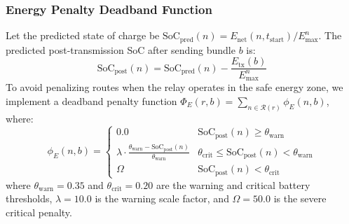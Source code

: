 \documentclass[a4paper,fleqn]{cas-dc}
\begin{document}
\subsubsection{Energy Penalty Deadband Function}
Let the predicted state of charge be $\text{SoC}_{\text{pred}}(n) = E_{\text{net}}(n, t_{\text{start}}) / E_{\max}^n$. The predicted post-transmission SoC after sending bundle $b$ is:
\begin{equation}
    \text{SoC}_{\text{post}}(n) = \text{SoC}_{\text{pred}}(n) - \frac{E_{\text{tx}}(b)}{E_{\max}^n}
\end{equation}
To avoid penalizing routes when the relay operates in the safe energy zone, we implement a deadband penalty function $\Phi_E(r, b) = \sum_{n \in \mathcal{R}(r)} \phi_E(n, b)$, where:
\begin{equation}
    \phi_E(n, b) = \begin{cases}
        0.0 & \text{SoC}_{\text{post}}(n) \geq \theta_{\text{warn}} \\
        \lambda \cdot \frac{\theta_{\text{warn}} - \text{SoC}_{\text{post}}(n)}{\theta_{\text{warn}}} & \theta_{\text{crit}} \leq \text{SoC}_{\text{post}}(n) < \theta_{\text{warn}} \\
        \Omega & \text{SoC}_{\text{post}}(n) < \theta_{\text{crit}}
    \end{cases}
\end{equation}
where $\theta_{\text{warn}} = 0.35$ and $\theta_{\text{crit}} = 0.20$ are the warning and critical battery thresholds, $\lambda = 10.0$ is the warning scale factor, and $\Omega = 50.0$ is the severe critical penalty.
\end{document}
